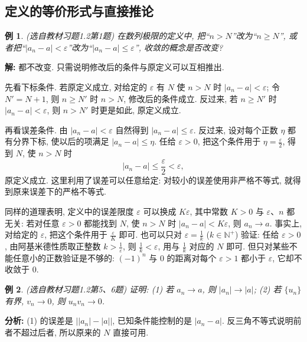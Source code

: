 \documentclass[UTF8,openany]{ctexbook}
\theoremstyle{chinesetextbook}
\newtheorem{example}{例}[section]
\newenvironment{cnsolution}{\par\indent\textbf{解:} \ignorespaces}{\par}
\begin{document}
\subsection{定义的等价形式与直接推论}
\begin{example}
\textnormal{(选自教材习题1.2第1题)} 在数列极限的定义中, 把“$n>N$”改为“$n\ge N$”, 或者把“$|a_n-a|<\varepsilon$”改为“$|a_n-a|\le\varepsilon$”, 收敛的概念是否改变?
\end{example}
\begin{cnsolution}
都不改变. 只需说明修改后的条件与原定义可以互相推出.

先看下标条件. 若原定义成立, 对给定的 $\varepsilon$ 有 $N$ 使 $n>N$ 时 $|a_n-a|<\varepsilon$; 令 $N'=N+1$, 则 $n\ge N'$ 时 $n>N$, 修改后的条件成立. 反过来, 若 $n\ge N'$ 时 $|a_n-a|<\varepsilon$, 则 $n>N'$ 时更是如此, 原定义成立.

再看误差条件. 由 $|a_n-a|<\varepsilon$ 自然得到 $|a_n-a|\le\varepsilon$. 反过来, 设对每个正数 $\eta$ 都有分界下标, 使以后的项满足 $|a_n-a|\le\eta$. 任给 $\varepsilon>0$, 把这个条件用于 $\displaystyle\eta=\frac\varepsilon2$, 得到 $N$, 使 $n>N$ 时
\[
|a_n-a|\le\frac\varepsilon2<\varepsilon,
\]
原定义成立. 这里利用了误差可以任意给定: 对较小的误差使用非严格不等式, 就得到原来误差下的严格不等式.
\end{cnsolution}
同样的道理表明, 定义中的误差限度 $\varepsilon$ 可以换成 $K\varepsilon$, 其中常数 $K>0$ 与 $\varepsilon$、$n$ 都无关: 若对任意 $\varepsilon>0$ 都能找到 $N$, 使 $n>N$ 时 $|a_n-a|<K\varepsilon$, 则 $a_n\to a$. 事实上, 对给定的 $\varepsilon$, 把这个条件用于 $\displaystyle\frac\varepsilon K$ 即可. 也可以只对 $\displaystyle\varepsilon=\frac1k$ ($k\in\mathbb N^+$) 验证: 任给 $\varepsilon>0$, 由阿基米德性质取正整数 $\displaystyle k>\frac1\varepsilon$, 则 $\displaystyle\frac1k<\varepsilon$, 用与 $\displaystyle\frac1k$ 对应的 $N$ 即可. 但只对某些不能任意小的正数验证是不够的: $(-1)^n$ 与 $0$ 的距离对每个 $\varepsilon>1$ 都小于 $\varepsilon$, 它却不收敛于 $0$.
\begin{example}
\textnormal{(选自教材习题1.2第5、6题)} 证明: (1) 若 $a_n\to a$, 则 $|a_n|\to|a|$; (2) 若 $\{u_n\}$ 有界, $v_n\to0$, 则 $u_nv_n\to0$.
\end{example}
\par\indent\textbf{分析:} (1) 的误差是 $\bigl||a_n|-|a|\bigr|$, 已知条件能控制的是 $|a_n-a|$. 反三角不等式说明前者不超过后者, 所以原来的 $N$ 直接可用.
\end{document}
